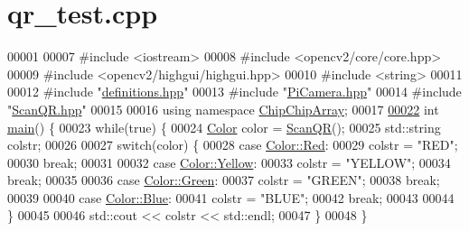 \hypertarget{qr__test_8cpp_source}{\section{qr\+\_\+test.\+cpp}
\label{qr__test_8cpp_source}
}

\begin{DoxyCode}
00001 
00007 \textcolor{preprocessor}{#include <iostream>}
00008 \textcolor{preprocessor}{#include <opencv2/core/core.hpp>}
00009 \textcolor{preprocessor}{#include <opencv2/highgui/highgui.hpp>}
00010 \textcolor{preprocessor}{#include <string>}
00011 
00012 \textcolor{preprocessor}{#include "\hyperlink{definitions_8hpp}{definitions.hpp}"}
00013 \textcolor{preprocessor}{#include "\hyperlink{PiCamera_8hpp}{PiCamera.hpp}"}
00014 \textcolor{preprocessor}{#include "\hyperlink{ScanQR_8hpp}{ScanQR.hpp}"}
00015 
00016 \textcolor{keyword}{using namespace }\hyperlink{namespaceChipChipArray}{ChipChipArray};
00017 
\hypertarget{qr__test_8cpp_source_l00022}{}\hyperlink{qr__test_8cpp_ae66f6b31b5ad750f1fe042a706a4e3d4}{00022} \textcolor{keywordtype}{int} \hyperlink{namespaceChipChipArray_a7fc3d1edffca11531cd09fdab7c8b88d}{main}() \{
00023     \textcolor{keywordflow}{while}(\textcolor{keyword}{true}) \{
00024         \hyperlink{definitions_8hpp_abc05a0f46084a3477cf5d5c939ff1436}{Color} color = \hyperlink{namespaceChipChipArray_a6c7465049b5d408e1a238b6d8ffa887d}{ScanQR}();
00025         std::string colstr;
00026 
00027         \textcolor{keywordflow}{switch}(color) \{
00028             \textcolor{keywordflow}{case} \hyperlink{definitions_8hpp_abc05a0f46084a3477cf5d5c939ff1436aee38e4d5dd68c4e440825018d549cb47}{Color::Red}:
00029                 colstr = \textcolor{stringliteral}{"RED"};
00030                 \textcolor{keywordflow}{break};
00031 
00032             \textcolor{keywordflow}{case} \hyperlink{definitions_8hpp_abc05a0f46084a3477cf5d5c939ff1436a51e6cd92b6c45f9affdc158ecca2b8b8}{Color::Yellow}:
00033                 colstr = \textcolor{stringliteral}{"YELLOW"};
00034                 \textcolor{keywordflow}{break};
00035 
00036             \textcolor{keywordflow}{case} \hyperlink{definitions_8hpp_abc05a0f46084a3477cf5d5c939ff1436ad382816a3cbeed082c9e216e7392eed1}{Color::Green}:
00037                 colstr = \textcolor{stringliteral}{"GREEN"};
00038                 \textcolor{keywordflow}{break};
00039 
00040             \textcolor{keywordflow}{case} \hyperlink{definitions_8hpp_abc05a0f46084a3477cf5d5c939ff1436a9594eec95be70e7b1710f730fdda33d9}{Color::Blue}:
00041                 colstr = \textcolor{stringliteral}{"BLUE"};
00042                 \textcolor{keywordflow}{break};
00043 
00044         \}
00045 
00046         std::cout << colstr << std::endl;
00047     \}
00048 \}
\end{DoxyCode}
